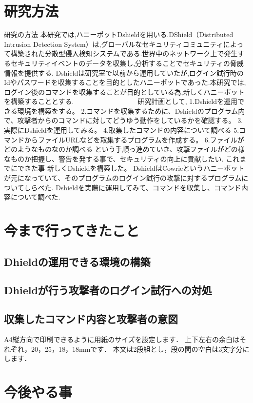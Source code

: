 \documentclass{entry}
\begin{document}
\section{研究方法}
研究の方法
本研究では,ハニーポットDshieldを用いる.DShield（Distributed Intrusion Detection System）は,グローバルなセキュリティコミュニティによって構築された分散型侵入検知システムである.世界中のネットワーク上で発生するセキュリティイベントのデータを収集し,分析することでセキュリティの脅威情報を提供する.
Dshieldは研究室で以前から運用していたが,ログイン試行時のIdやパスワードを収集することを目的としたハニーポットであった.本研究では,ログイン後のコマンドを収集することが目的としている為,新しくハニーポットを構築することとする.　　　　　　　　　
研究計画として,
1.Dshieldを運用できる環境を構築をする。
2.コマンドを収集するために、Dshieldのプログラム内で、攻撃者からのコマンドに対してどうゆう動作をしているかを確認する。
3.実際にDshieldを運用してみる。
4.取集したコマンドの内容について調べる
5.コマンドからファイルURLなどを取集するプログラムを作成する。
6.ファイルがどのようなものなのか調べる
という手順っ進めていき、攻撃ファイルがどの様なものか把握し、警告を発する事で、セキュリティの向上に貢献したい.
これまでにできた事
新しくDshieldを構築した。
DshieldはCowrieというハニーポットが元になっていて、そのプログラムのログイン試行の攻撃に対するプログラムについてしらべた.
Dshieldを実際に運用してみて、コマンドを収集し、コマンド内容について調べた.

\section{今まで行ってきたこと}
\subsection{Dhieldの運用できる環境の構築}
\subsection{Dhieldが行う攻撃者のログイン試行への対処}
\subsection{収集したコマンド内容と攻撃者の意図}

A4縦方向で印刷できるように用紙のサイズを設定します．
上下左右の余白はそれぞれ，20，25，18，18mmです．
本文は2段組とし，段の間の空白は3文字分にします．

\section{今後やる事}




%

\end{document}
